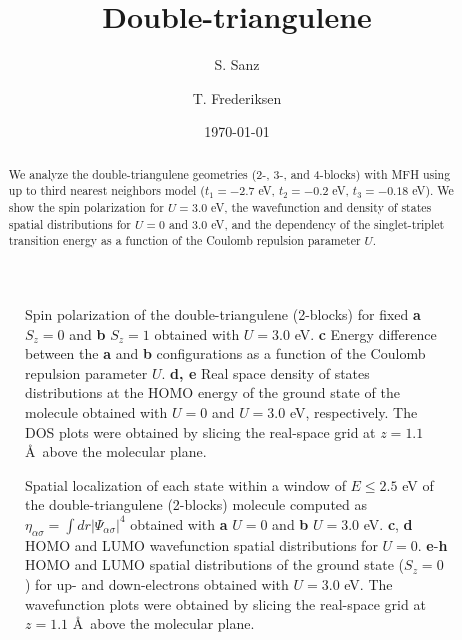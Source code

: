 \documentclass[twocolumn,amsmath,%
amssymb,prb,superscriptaddress]{revtex4}
\begin{document}
\title{Double-triangulene}

\author{S. Sanz}

\author{T. Frederiksen}

\date{\today}

\begin{abstract}
We analyze the double-triangulene geometries (2-, 3-, and 4-blocks) with MFH using up to third nearest neighbors model ($t_{1}=-2.7$ eV, $t_{2}=-0.2$ eV, $t_{3}=-0.18$ eV). We show the spin polarization for $ U=3.0$ eV, the wavefunction and density of states spatial distributions for $U=0$ and $3.0$ eV, and the dependency of the singlet-triplet transition energy as a function of the Coulomb repulsion parameter $U$. 
\end{abstract}

\maketitle

\begin{figure*}
	\scalebox{.8}{}
	\caption{Spin polarization of the double-triangulene (2-blocks) for fixed \textbf{a} $S_{z}=0$ and \textbf{b} $S_{z}=1$ obtained with $U=3.0$ eV. \textbf{c} Energy difference between the \textbf{a} and \textbf{b} configurations as a function of the Coulomb repulsion parameter $U$.  \textbf{d, e} Real space density of states distributions at the HOMO energy of the ground state of the molecule obtained with $U=0$ and $U=3.0$ eV, respectively. The DOS plots were obtained by slicing the real-space grid at $z=1.1$ \AA \ above the molecular plane.}
\end{figure*}


\begin{figure*}
	\scalebox{.8}{}
	\caption{Spatial localization of each state within a window of $E\leqslant 2.5$ eV of the double-triangulene (2-blocks) molecule computed as $\eta_{\alpha\sigma} = \int dr |\Psi_{\alpha\sigma}|^{4}$ obtained with \textbf{a} $U=0$ and \textbf{b} $U=3.0$ eV. \textbf{c}, \textbf{d} HOMO and LUMO wavefunction spatial distributions for $U = 0$. \textbf{e}-\textbf{h} HOMO and LUMO spatial distributions of the ground state ($S_{z} = 0$) for up- and down-electrons obtained with $U=3.0$ eV. The wavefunction
plots were obtained by slicing the real-space grid at $z=1.1$ \AA \ above the molecular plane.}
\end{figure*}
\end{document}
